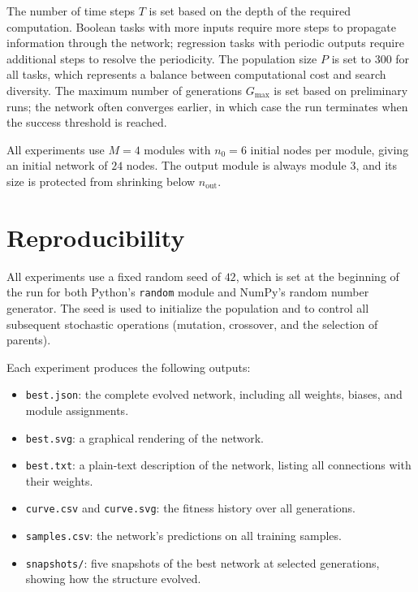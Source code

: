 The number of time steps $T$ is set based on the depth of the
required computation. Boolean tasks with more inputs require more
steps to propagate information through the network; regression tasks
with periodic outputs require additional steps to resolve the
periodicity. The population size $P$ is set to $300$ for all tasks,
which represents a balance between computational cost and search
diversity. The maximum number of generations $G_{\max}$ is set based
on preliminary runs; the network often converges earlier, in which
case the run terminates when the success threshold is reached.

All experiments use $M = 4$ modules with $n_0 = 6$ initial nodes per
module, giving an initial network of $24$ nodes. The output module is
always module $3$, and its size is protected from shrinking below
$n_{\text{out}}$.

\section{Reproducibility}
\label{sec:reproducibility-exp}

All experiments use a fixed random seed of $42$, which is set at the
beginning of the run for both Python's \texttt{random} module and
NumPy's random number generator. The seed is used to initialize the
population and to control all subsequent stochastic operations
(mutation, crossover, and the selection of parents).

Each experiment produces the following outputs:

\begin{itemize}
  \item \texttt{best.json}: the complete evolved network, including
    all weights, biases, and module assignments.
  \item \texttt{best.svg}: a graphical rendering of the network.
  \item \texttt{best.txt}: a plain-text description of the network,
    listing all connections with their weights.
  \item \texttt{curve.csv} and \texttt{curve.svg}: the fitness history
    over all generations.
  \item \texttt{samples.csv}: the network's predictions on all
    training samples.
  \item \texttt{snapshots/}: five snapshots of the best network at
    selected generations, showing how the structure evolved.
\end{itemize}

